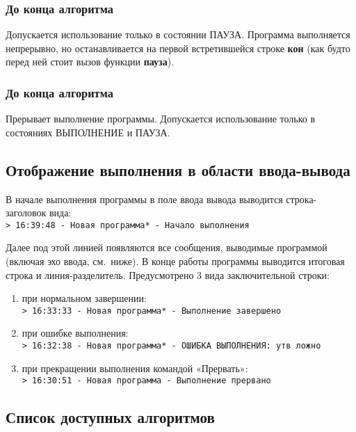 \documentclass[12pt,a4paper]{article}
\begin{document}
\subsubsection{До конца алгоритма}

Допускается использование только в состоянии ПАУЗА. Программа выполняется непрерывно, но останавливается на первой встретившейся строке \textsf{\textbf{кон}} (как будто перед ней стоит вызов функции \textsf{\textbf{пауза}}).

\subsubsection{До конца алгоритма}

Прерывает выполнение программы. Допускается использование только в состояниях ВЫПОЛНЕНИЕ и ПАУЗА.

\subsection{Отображение выполнения в области ввода-вывода}
\label{io-run}

В начале выполнения программы в поле ввода вывода выводится строка-заголовок вида:\\
\texttt{> 16:39:48 - Новая программа* - Начало выполнения}

Далее под этой линией появляются все сообщения, выводимые программой (включая эхо ввода, см.~ниже). В конце работы программы выводится итоговая строка и линия-разделитель. Предусмотрено 3 вида заключительной строки:
\begin{enumerate}
\item при нормальном завершении:\\
\texttt{> 16:33:33 - Новая программа* - Выполнение завершено}
	
\item при ошибке выполнения:\\
\texttt{> 16:32:38 - Новая программа* - ОШИБКА ВЫПОЛНЕНИЯ: утв ложно}

\item при прекращении выполнения командой «Прервать»:\\
\texttt{> 16:30:51 - Новая программа - Выполнение прервано}
\end{enumerate}

\subsection{Список доступных алгоритмов}
\label{useralgs}
\end{document}
